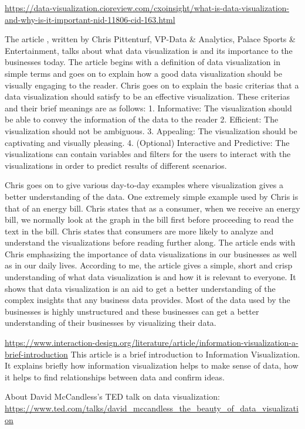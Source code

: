 \documentclass[]{book}
\theoremstyle{definition}
\theoremstyle{definition}
\theoremstyle{definition}
\theoremstyle{remark}
\begin{document}
\url{https://data-visualization.cioreview.com/cxoinsight/what-is-data-visualization-and-why-is-it-important-nid-11806-cid-163.html}

The article , written by Chris Pittenturf, VP-Data \& Analytics, Palace
Sports \& Entertainment, talks about what data visualization is and its
importance to the businesses today. The article begins with a definition
of data visualization in simple terms and goes on to explain how a good
data visualization should be visually engaging to the reader. Chris goes
on to explain the basic criterias that a data visualization should
satisfy to be an effective visualization. These criterias and their
brief meanings are as follows: 1. Informative: The visualization should
be able to convey the information of the data to the reader 2.
Efficient: The visualization should not be ambiguous. 3. Appealing: The
visualization should be captivating and visually pleasing. 4. (Optional)
Interactive and Predictive: The visualizations can contain variables and
filters for the users to interact with the visualizations in order to
predict results of different scenarios.

Chris goes on to give various day-to-day examples where visualization
gives a better understanding of the data. One extremely simple example
used by Chris is that of an energy bill. Chris states that as a
consumer, when we receive an energy bill, we normally look at the graph
in the bill first before proceeding to read the text in the bill. Chris
states that consumers are more likely to analyze and understand the
visualizations before reading further along. The article ends with Chris
emphasizing the importance of data visualizations in our businesses as
well as in our daily lives. According to me, the article gives a simple,
short and crisp understanding of what data visualization is and how it
is relevant to everyone. It shows that data visualization is an aid to
get a better understanding of the complex insights that any business
data provides. Most of the data used by the businesses is highly
unstructured and these businesses can get a better understanding of
their businesses by visualizing their data.

\url{https://www.interaction-design.org/literature/article/information-visualization-a-brief-introduction}
This article is a brief introduction to Information Visualization. It
explains briefly how information visualization helps to make sense of
data, how it helps to find relationships between data and confirm ideas.

About David McCandless's TED talk on data visualization:
\url{https://www.ted.com/talks/david_mccandless_the_beauty_of_data_visualization}
\end{document}
